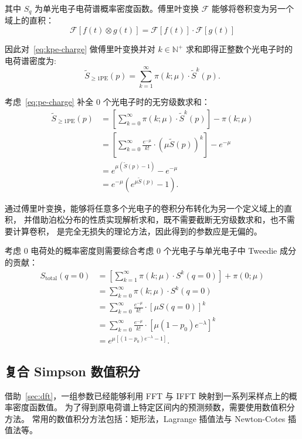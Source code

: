 其中 $S_q$ 为单光电子电荷谱概率密度函数。傅里叶变换 $\mathcal{F}$ 能够将卷积变为另一个域上的直积：
\begin{equation}
    \mathcal{F}\left[f(t)\otimes g(t)\right]=\mathcal{F}[f(t)]\cdot\mathcal{F}[g(t)]
    \label{eq:fourier}
\end{equation}

因此对~\eqref{eq:kpe-charge} 做傅里叶变换并对 $k\in\mathbb{N}^{+}$ 求和即得正整数个光电子时的电荷谱密度为:
\begin{equation}
    \tilde{S}_{\ge1\text{PE}}(p)=\sum_{k=1}^{\infty}
    \pi(k;\mu)\cdot\tilde{S}^k(p).
    \label{eq:pe-charge}
\end{equation}

考虑~\eqref{eq:pe-charge} 补全 0 个光电子时的无穷级数求和：
\begin{align}
    \tilde{S}_{\ge1\text{PE}}(p)
    &=\left[\sum_{k=0}^{\infty}\pi(k;\mu)\cdot\tilde{S}^k(p)\right]-\pi(k;\mu)\\
    &=\left[\sum_{k=0}^{\infty}\frac{e^{-\mu}}{k!}\cdot\left(\mu\tilde{S}(p)\right)^k\right]-e^{-\mu}\\
    &=e^{\mu(\tilde{S}(p)-1)}-e^{-\mu}\\
    &=e^{-\mu}(e^{\mu\tilde{S}(p)}-1).
    \label{eq:postive-charge}
\end{align}

通过傅里叶变换，能够将任意多个光电子的卷积分布转化为另一个定义域上的直积，
并借助泊松分布的性质实现解析求和，既不需要截断无穷级数求和，也不需要计算卷积，
是完全无损失的理论方法，因此得到的参数应是无偏的。

考虑 0 电荷处的概率密度则需要综合考虑 0 个光电子与单光电子中 Tweedie 成分的贡献：
\begin{align}
    S_{\text{total}}(q=0)
    &=\left[\sum_{k=1}^{\infty}\pi(k;\mu)\cdot S^k(q=0)\right]+\pi(0;\mu)\\
    &=\sum_{k=0}^{\infty}\pi(k;\mu)\cdot S^k(q=0)\\
    &=\sum_{k=0}^{\infty}\frac{e^{-\mu}}{k!}\cdot\left[\mu S(q=0)\right]^k\\
    &=\sum_{k=0}^{\infty}\frac{e^{-\mu}}{k!}\cdot\left[\mu(1-p_0)e^{-\lambda}\right]^k\\
    &=e^{\mu\left[(1-p_0)e^{-\lambda}-1\right]}.
    \label{eq:zero-charge}
\end{align}

\subsection{复合 Simpson 数值积分}
借助~\ref{sec:dft}，一组参数已经能够利用 FFT 与 IFFT 映射到一系列采样点上的概率密度函数值。
为了得到原电荷谱上特定区间内的预测频数，需要使用数值积分方法。
常用的数值积分方法包括：矩形法，Lagrange 插值法与 Newton-Cotes 插值法等。

